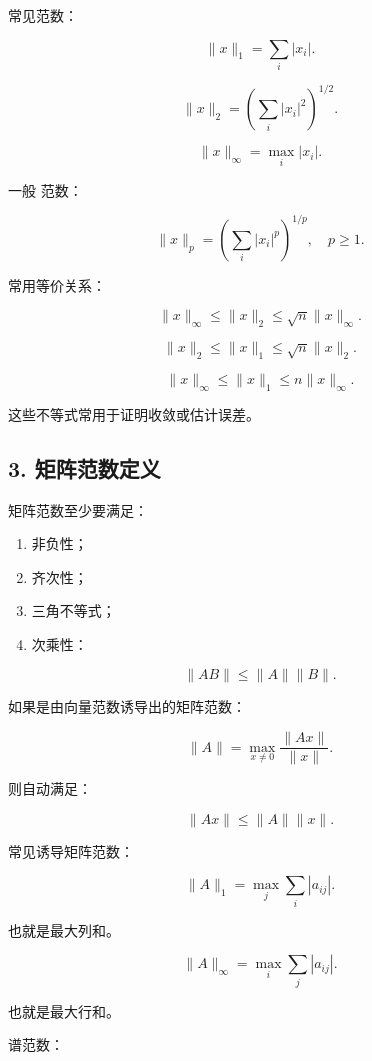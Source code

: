 \documentclass[11pt,a4paper]{ctexart}
\newcommand{\code}[1]{\begingroup\ttfamily\small #1\endgroup}
\begin{document}
常见范数：

\[
\|x\|_1=\sum_i |x_i|.
\]

\[
\|x\|_2=\left(\sum_i |x_i|^2\right)^{1/2}.
\]

\[
\|x\|_\infty=\max_i |x_i|.
\]

一般 \code{} 范数：

\[
\|x\|_p=\left(\sum_i |x_i|^p\right)^{1/p},\quad p\ge 1.
\]

常用等价关系：

\[
\|x\|_\infty \le \|x\|_2 \le \sqrt n\|x\|_\infty.
\]

\[
\|x\|_2 \le \|x\|_1 \le \sqrt n\|x\|_2.
\]

\[
\|x\|_\infty \le \|x\|_1 \le n\|x\|_\infty.
\]

这些不等式常用于证明收敛或估计误差。


\subsection*{3. 矩阵范数定义}


矩阵范数至少要满足：

\begin{enumerate}

\item 非负性；

\item 齐次性；

\item 三角不等式；

\item 次乘性：

\end{enumerate}

\[
\|AB\|\le \|A\|\|B\|.
\]

如果是由向量范数诱导出的矩阵范数：

\[
\|A\|=\max_{x\ne 0}\frac{\|Ax\|}{\|x\|}.
\]

则自动满足：

\[
\|Ax\|\le \|A\|\|x\|.
\]

常见诱导矩阵范数：

\[
\|A\|_1=\max_j \sum_i |a_{ij}|.
\]

也就是最大列和。

\[
\|A\|_\infty=\max_i \sum_j |a_{ij}|.
\]

也就是最大行和。

谱范数：
\end{document}
